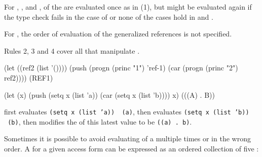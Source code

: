 For , , and 
,  of the 
 are evaluated once as in (1), but might be evaluated again if the
type check fails in the case of  
or none of the cases hold in
 and .

For , the order of evaluation of the generalized 
references is not specified.  

\endlist
Rules 2, 3 and 4 cover all   that manipulate
.


\code
 (let ((ref2 (list '())))
   (push (progn (princ "1") 'ref-1)
         (car (progn (princ "2") ref2)))) 
\EV (REF1)

 (let (x)
    (push (setq x (list 'a))
          (car (setq x (list 'b))))
     x)
\EV (((A) . B))
\endcode

 first evaluates {\tt (setq x (list 'a)) \EV\ (a)},
 then evaluates {\tt (setq x (list 'b)) \EV\ (b)},
 then modifies the  of this latest value to be {\tt ((a) . b)}.

\endsubsubsubsection%

\endsubsubsection%



Sometimes it is possible to avoid evaluating  of a 
 multiple times or in the wrong order.  A
for a given access form can be expressed as an ordered collection of five :


